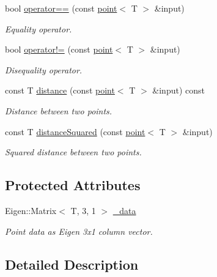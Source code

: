 \begin{DoxyCompactItemize}
bool \hyperlink{classddd_1_1point_a98f8e8097257f053b85e1ee32352fda4}{operator==} (const \hyperlink{classddd_1_1point}{point}$<$ T $>$ \&input)
\begin{DoxyCompactList}\small\item\em Equality operator. \end{DoxyCompactList}\item 
bool \hyperlink{classddd_1_1point_a2567b8c3cd08d965e70033f3f4a8d3db}{operator!=} (const \hyperlink{classddd_1_1point}{point}$<$ T $>$ \&input)
\begin{DoxyCompactList}\small\item\em Disequality operator. \end{DoxyCompactList}\item 
const T \hyperlink{classddd_1_1point_a59d8714cc178090ddf75b0c9dbd832c9}{distance} (const \hyperlink{classddd_1_1point}{point}$<$ T $>$ \&input) const
\begin{DoxyCompactList}\small\item\em Distance between two points. \end{DoxyCompactList}\item 
const T \hyperlink{classddd_1_1point_a4b6793fd154fc9ad4dd93a4927d4ee13}{distance\+Squared} (const \hyperlink{classddd_1_1point}{point}$<$ T $>$ \&input)
\begin{DoxyCompactList}\small\item\em Squared distance between two points. \end{DoxyCompactList}\end{DoxyCompactItemize}
\subsection*{Protected Attributes}
\begin{DoxyCompactItemize}
\item 
\mbox{\label{classddd_1_1point_af4781a60e5c93aeaaab5c66add25b991}} 
Eigen\+::\+Matrix$<$ T, 3, 1 $>$ \hyperlink{classddd_1_1point_af4781a60e5c93aeaaab5c66add25b991}{\+\_\+data}
\begin{DoxyCompactList}\small\item\em Point data as Eigen 3x1 column vector. \end{DoxyCompactList}\end{DoxyCompactItemize}


\subsection{Detailed Description}
